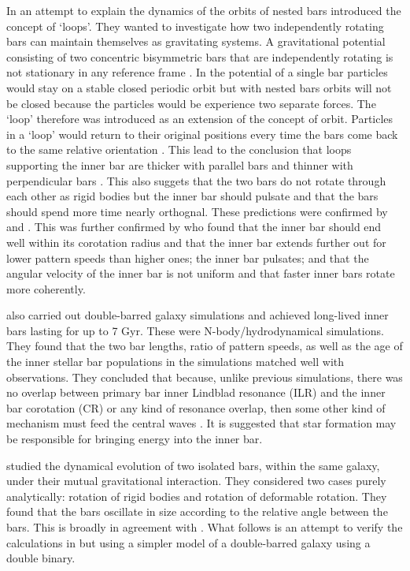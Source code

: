 \documentclass[a4paper,12pt]{article}
\begin{document}
In an attempt to explain the dynamics of the orbits of nested bars \cite{macie7} introduced the concept of `loops'. They wanted to investigate how two independently rotating bars can maintain
themselves as gravitating systems. A gravitational potential consisting of two concentric bisymmetric bars that are independently rotating is not stationary in any reference frame \cite{macie7}. In the potential
of a single bar particles would stay on a stable closed periodic orbit but with nested bars orbits will not be closed because the particles would be experience two separate forces. The `loop' therefore was
introduced as an extension of the concept of orbit. Particles in a `loop' would return to their original positions every time the bars come back to the same relative orientation \citep{macie7}. This lead to
the conclusion that loops supporting the inner bar are thicker with parallel bars and thinner with perpendicular bars \citep{macie3}. This also suggets that the two bars do not rotate through each other as rigid bodies
but the inner bar should pulsate and that the bars should spend more time nearly orthognal\citep{macie3}. These predictions were confirmed by \citep{debattista} and \citep{shen1}. 
This was further confirmed by \cite{macie5} who found
that the inner bar should end well within its corotation radius and that the inner bar extends further out for lower pattern speeds than higher ones; the inner bar pulsates; and that the angular velocity of the inner
bar is not uniform and that faster inner bars rotate more coherently.

\cite{wozniak} also carried out double-barred galaxy simulations and achieved long-lived inner bars lasting for up to 7 Gyr. These were N-body/hydrodynamical simulations. They found that the two bar lengths, ratio of
pattern speeds, as well as the age of the inner stellar bar populations in the simulations matched well with observations. They concluded that because, unlike previous simulations, there was no overlap between primary bar 
inner Lindblad resonance (ILR) and the inner bar corotation (CR) or any kind of resonance overlap, then some other kind of mechanism must feed the central waves \citep{wozniak}. It is suggested that star 
formation may be responsible for bringing energy into the inner bar.

\cite{garzon} studied the dynamical evolution of two isolated bars, within the same galaxy, under their mutual gravitational interaction. They considered two cases purely analytically: rotation of rigid bodies and
rotation of deformable rotation. They found that the bars oscillate in size according to the relative angle between the bars. This is broadly in agreement with \citep{debattista}.
What follows is an attempt to verify the calculations in \citep{garzon} but using a simpler model of a double-barred galaxy using a double binary.
\end{document}
